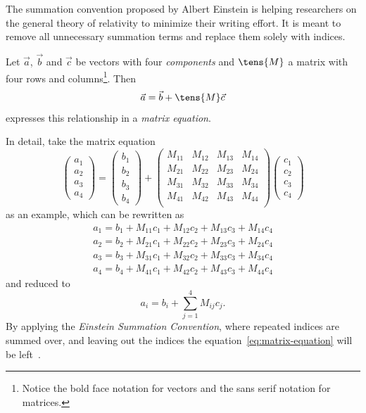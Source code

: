 The summation convention proposed by Albert Einstein is helping researchers 
on the general theory of relativity to minimize their writing effort.
It is meant to remove all unnecessary summation terms and replace them solely 
with indices.

Let $\vec{a}$, $\vec{b}$ and $\vec{c}$ be vectors with four \emph{components}
and $\tens{M}$ a matrix with four rows and columns\footnote{
Notice the bold face notation for vectors and the sans serif notation 
for matrices.}. Then 
\begin{equation}
  \vec{a} = \vec{b} + \tens{M}\vec{c}
  \label{eq:matrix-equation}
\end{equation}
expresses this relationship in a \emph{matrix equation}.

In detail, take the matrix equation 
\begin{equation}
  \begin{pmatrix}
    a_1 \\ a_2 \\ a_3 \\ a_4
  \end{pmatrix}
  =
  \begin{pmatrix}
    b_1 \\ b_2 \\ b_3 \\ b_4
  \end{pmatrix}
  +
  \begin{pmatrix}
    M_{11} & M_{12} & M_{13} & M_{14} \\
    M_{21} & M_{22} & M_{23} & M_{24} \\
    M_{31} & M_{32} & M_{33} & M_{34} \\
    M_{41} & M_{42} & M_{43} & M_{44} \\
  \end{pmatrix}
  \begin{pmatrix}
    c_1 \\ c_2 \\ c_3 \\ c_4 
  \end{pmatrix}
  \label{eq:example-matrix-equation}
\end{equation}
as an example, which can be rewritten as 
\begin{equation}
  \begin{aligned}
    a_1 = b_1 + M_{11}c_1 + M_{12}c_2 + M_{13}c_3 + M_{14}c_4 \\
    a_2 = b_2 + M_{21}c_1 + M_{22}c_2 + M_{23}c_3 + M_{24}c_4 \\
    a_3 = b_3 + M_{31}c_1 + M_{32}c_2 + M_{33}c_3 + M_{34}c_4 \\
    a_4 = b_4 + M_{41}c_1 + M_{42}c_2 + M_{43}c_3 + M_{44}c_4 
  \end{aligned}
  \label{eq:rewritten-matrix-equation}
\end{equation}
and reduced to 
\begin{equation}
  a_i = b_i + \sum_{j=1}^{4} M_{ij}c_j.
  \label{eq:reduction-matrix-equation}
\end{equation}
By applying the \emph{Einstein Summation Convention}, where repeated indices are summed over, and
leaving out the indices the equation~\ref{eq:matrix-equation} 
will be left~\cite{Article:summation_convention_01_barr}.

